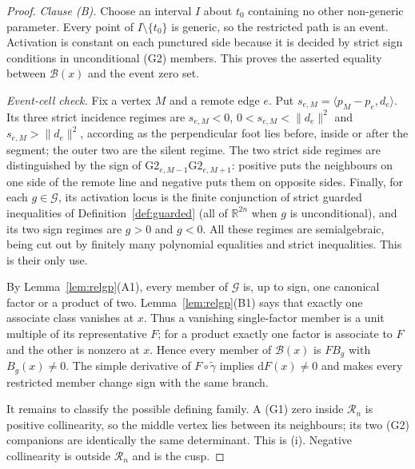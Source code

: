 \begin{proof}
\emph{Clause (B).} Choose an interval $I$ about $t_0$ containing no other non-generic parameter.
Every point of $I\setminus\{t_0\}$ is generic, so the restricted path is an
event. Activation is constant on each punctured side because it is decided by
strict sign conditions in unconditional (G2) members. This proves the asserted
equality between $\mathcal B(x)$ and the event zero set.

\emph{Event-cell check.} Fix a vertex $M$ and a remote edge $e$. Put
$s_{e,M}=\langle p_M-p_e,d_e\rangle$. Its three strict incidence regimes are
$s_{e,M}<0$, $0<s_{e,M}<\lVert d_e\rVert^2$ and
$s_{e,M}>\lVert d_e\rVert^2$, according as the perpendicular foot lies before,
inside or after the segment; the outer two are the silent regime. The two
strict side regimes are distinguished by the sign of
$\mathrm{G2}_{e,M-1}\mathrm{G2}_{e,M+1}$: positive puts the neighbours on one
side of the remote line and negative puts them on opposite sides. Finally, for
each $g\in\mathcal G$, its activation locus is the finite conjunction of
strict guarded inequalities of Definition~\ref{def:guarded} (all of
$\mathbb R^{2n}$ when $g$ is unconditional), and its two sign regimes are
$g>0$ and $g<0$. All these regimes are semialgebraic, being cut out by finitely
many polynomial equalities and strict inequalities. This is their only use.

By Lemma~\ref{lem:relgp}(A1), every member of $\mathcal G$ is, up to
sign, one canonical factor or a product of two. Lemma~\ref{lem:relgp}(B1) says that
exactly one associate class vanishes at $x$. Thus a vanishing single-factor
member is a unit multiple of its representative $F$; for a product exactly one
factor is associate to $F$ and the other is nonzero at $x$. Hence every member
of $\mathcal B(x)$ is $F B_g$ with $B_g(x)\neq0$. The simple derivative of
$F\circ\tilde\gamma$ implies $\mathrm dF(x)\neq0$ and makes every restricted
member change sign with the same branch.

It remains to classify the possible defining family. A (G1) zero inside
$\mathcal R_n$ is positive collinearity, so the middle vertex lies between its
neighbours; its two (G2) companions are identically the same determinant. This
is (i). Negative collinearity is outside $\mathcal R_n$ and is the cusp.


\end{proof}
